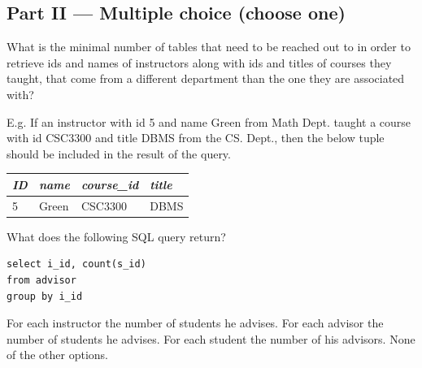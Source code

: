 \documentclass[12pt, addpoints, answers]{exam}
\begin{document}
\begin{questions}

\section*{Part II — Multiple choice (choose one)}

\begin{minipage}{\linewidth}
\question[2]
What is the minimal number of tables that need to be reached out to in order to retrieve ids and names of instructors 
along with ids and titles of courses they taught, that come from a different department than the one they are associated with?\par\vspace{0.5em}
E.g. If an instructor with id 5 and name Green from Math Dept. taught a course with id CSC3300 and title DBMS from the CS. Dept., 
then the below tuple should be included in the result of the query.\par\vspace{0.5em}
\begin{tabular}{|l|l|l|l|}
\hline
\textit{ID} & \textit{name} & \textit{course\_id} & \textit{title} \\
\hline
5 & Green & CSC3300 & DBMS \\
\hline
\end{tabular}
\begin{checkboxes} 
\end{checkboxes}
\end{minipage}\vspace{1em}

\begin{minipage}{\linewidth}
\question[2]
What does the following SQL query return?\par\vspace{0.5em}
\begin{verbatim}
select i_id, count(s_id) 
from advisor 
group by i_id
\end{verbatim}
\begin{checkboxes} 
    \choice For each instructor the number of students he advises.
    \choice For each advisor the number of students he advises.
    \choice For each student the number of his advisors.
    \CorrectChoice None of the other options.
\end{checkboxes}
\end{minipage}\vspace{1em}


\end{questions}
\end{document}
